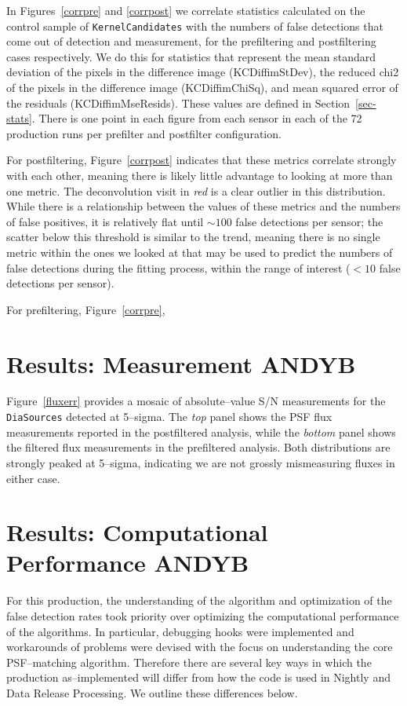 \documentclass[prd, nofootinbib, floatfix, 11pt,tightenlines,times]{article}
\begin{document}
In Figures~\ref{corrpre} and \ref{corrpost} we correlate statistics
calculated on the control sample of {\tt KernelCandidates} with the
numbers of false detections that come out of detection and
measurement, for the prefiltering and postfiltering cases
respectively.  We do this for statistics that represent the mean
standard deviation of the pixels in the difference image
(KCDiffimStDev), the reduced chi2 of the pixels in the difference
image (KCDiffimChiSq), and mean squared error of the residuals
(KCDiffimMseResids).  These values are defined in
Section~\ref{sec-stats}.  There is one point in each figure from each
sensor in each of the 72 production runs per prefilter and postfilter
configuration.

For postfiltering, Figure~\ref{corrpost} indicates that these metrics
correlate strongly with each other, meaning there is likely little
advantage to looking at more than one metric.  The deconvolution visit
in {\it red} is a clear outlier in this distribution.  While there is
a relationship between the values of these metrics and the numbers of
false positives, it is relatively flat until $\sim 100$ false
detections per sensor; the scatter below this threshold is similar to
the trend, meaning there is no single metric within the ones we looked
at that may be used to predict the numbers of false detections during
the fitting process, within the range of interest ($<10$ false
detections per sensor).

For prefiltering, Figure~\ref{corrpre}, 

\section{Results: Measurement {\bf ANDYB}}

Figure~\ref{fluxerr} provides a mosaic of absolute--value S/N
measurements for the {\tt DiaSources} detected at 5--sigma.  The {\it
  top} panel shows the PSF flux measurements reported in the
postfiltered analysis, while the {\it bottom} panel shows the filtered
flux measurements in the prefiltered analysis.  Both distributions are
strongly peaked at 5--sigma, indicating we are not grossly
mismeasuring fluxes in either case.

\section{Results: Computational Performance {\bf ANDYB}}

For this production, the understanding of the algorithm and
optimization of the false detection rates took priority over
optimizing the computational performance of the algorithms.  In
particular, debugging hooks were implemented and workarounds of
problems were devised with the focus on understanding the core
PSF--matching algorithm.  Therefore there are several key ways in
which the production as--implemented will differ from how the code is
used in Nightly and Data Release Processing.  We outline these
differences below.
\end{document}
